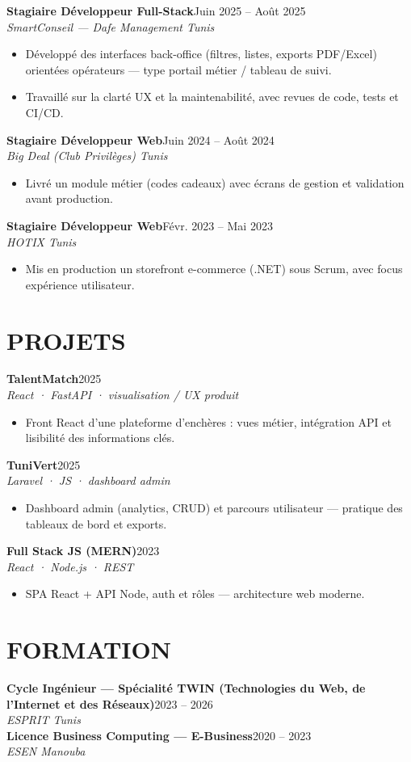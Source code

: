 \documentclass[10pt,a4paper]{article}
\newcommand{\job}[3]{%
  \textbf{\color{primary}#1}\hfill{\color{muted}\small #2}\\[-1pt]
  {\color{accent}\textit{#3}}\\[2pt]
  \begin{itemize}[leftmargin=0.85em, itemsep=1pt, topsep=0pt, parsep=0pt, partopsep=0pt]
}
\newcommand{\proj}[3]{%
  \textbf{\color{primary}#1}\hfill{\color{muted}\small #2}\\[-1pt]
  {\color{accent}\textit{#3}}\\[1pt]
  \begin{itemize}[leftmargin=0.85em, itemsep=1pt, topsep=0pt, parsep=0pt, partopsep=0pt]
}
\newcommand{\edu}[3]{%
  \textbf{\color{primary}#1}\hfill{\color{muted}\small #2}\\[-1pt]
  {\color{accent}\textit{#3}}\\[3pt]
}
\begin{document}
\job{Stagiaire Développeur Full-Stack}{Juin 2025 -- Août 2025}{SmartConseil — Dafe Management \textbar{} Tunis}
  \item Développé des interfaces back-office (filtres, listes, exports PDF/Excel) orientées opérateurs --- type portail métier / tableau de suivi.
  \item Travaillé sur la clarté UX et la maintenabilité, avec revues de code, tests et CI/CD.
\end{itemize}

\job{Stagiaire Développeur Web}{Juin 2024 -- Août 2024}{Big Deal (Club Privilèges) \textbar{} Tunis}
  \item Livré un module métier (codes cadeaux) avec écrans de gestion et validation avant production.
\end{itemize}

\job{Stagiaire Développeur Web}{Févr. 2023 -- Mai 2023}{HOTIX \textbar{} Tunis}
  \item Mis en production un storefront e-commerce (.NET) sous Scrum, avec focus expérience utilisateur.
\end{itemize}

\section{PROJETS}
{\footnotesize
\setlength{\parskip}{1pt}
\proj{TalentMatch}{2025}{React · FastAPI · visualisation / UX produit}
  \item Front React d'une plateforme d'enchères : vues métier, intégration API et lisibilité des informations clés.
\end{itemize}
\proj{TuniVert}{2025}{Laravel · JS · dashboard admin}
  \item Dashboard admin (analytics, CRUD) et parcours utilisateur --- pratique des tableaux de bord et exports.
\end{itemize}
\proj{Full Stack JS (MERN)}{2023}{React · Node.js · REST}
  \item SPA React + API Node, auth et rôles --- architecture web moderne.
\end{itemize}
}

\section{FORMATION}
\edu{Cycle Ingénieur — Spécialité TWIN (Technologies du Web, de l'Internet et des Réseaux)}{2023 -- 2026}{ESPRIT \textbar{} Tunis}
\edu{Licence Business Computing — E-Business}{2020 -- 2023}{ESEN \textbar{} Manouba}
\end{document}
